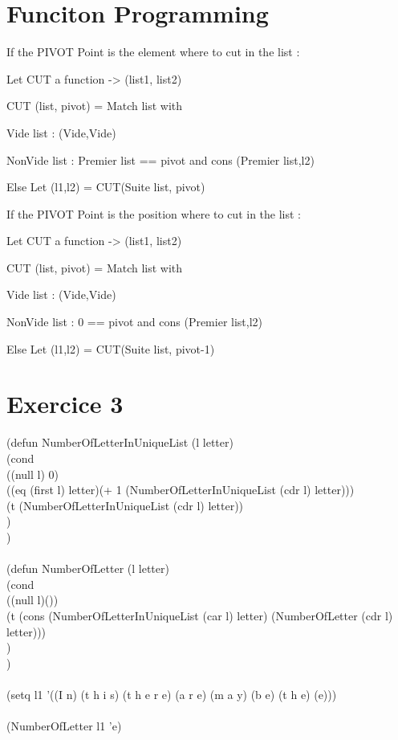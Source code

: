 \documentclass[a4paper,11pt]{article}
\begin{document}
\section{Funciton Programming}
If the PIVOT Point is the element where to cut in the list :

Let CUT a function -> (list1, list2)

CUT (list, pivot) = Match list with

Vide list : (Vide,Vide)

NonVide list : Premier list == pivot and cons (Premier list,l2)

	       Else Let (l1,l2) = CUT(Suite list, pivot)

	       
If the PIVOT Point is the position where to cut in the list :

Let CUT a function -> (list1, list2)

CUT (list, pivot) = Match list with

Vide list : (Vide,Vide)

NonVide list : 0 == pivot and cons (Premier list,l2)

	       Else Let (l1,l2) = CUT(Suite list, pivot-1)

\section{Exercice 3}
(defun NumberOfLetterInUniqueList (l letter)\\
  (cond\\
    ((null l) 0)\\
    ((eq (first l) letter)(+ 1 (NumberOfLetterInUniqueList (cdr l) letter)))\\
    (t (NumberOfLetterInUniqueList (cdr l) letter))\\
  )\\
)\\
\\
(defun NumberOfLetter (l letter)\\
  (cond\\
    ((null l)())\\
    (t (cons (NumberOfLetterInUniqueList (car l) letter) (NumberOfLetter (cdr l) letter)))\\
  )\\
)\\
\\
(setq l1 '((I n) (t h i s) (t h e r e) (a r e) (m a y) (b e) (t h e) (e)))\\
\\
(NumberOfLetter l1 'e)\\
\end{document}
